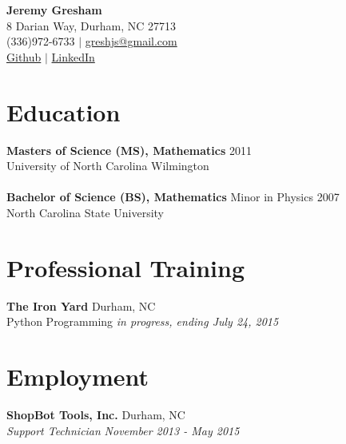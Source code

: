 \documentclass[10pt]{article}
\begin{document}
\begin{center}
{\bf\Large Jeremy Gresham}\\
8 Darian Way, Durham, NC 27713\\
(336)\hspace{4pt}972\hspace{3pt}-\hspace{3pt}6733 $\mid$
\href{mailto:greshjs@gmail.com}{greshjs@gmail.com}\\

\href{https://github.com/IHautaI}{Github} $\mid$
\href{https://www.linkedin.com/in/JSGresham}{LinkedIn}\\
\end{center}


\section*{Education}

{\bf Masters of Science (MS), Mathematics} \hfill 2011\\
University of North Carolina Wilmington\\
\\
{\bf Bachelor of Science (BS), Mathematics} Minor in Physics \hfill 2007\\
North Carolina State University


\section*{Professional Training}

{\bf The Iron Yard} \hfill Durham, NC\\
Python Programming \hfill {\it in progress, ending July 24, 2015}


\section*{Employment}


\noindent
{\bf ShopBot Tools, Inc.} \hfill Durham, NC\\
{\it Support Technician} \hfill {\it November 2013 - May 2015}
\end{document}
